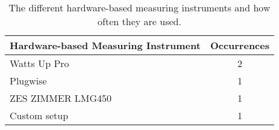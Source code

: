 \begin{table}[ht]
    \centering
    \begin{tabular}{| l | c |}
    \hline
    \textbf{Hardware-based Measuring Instrument}  & \textbf{Occurrences}                    \\ \hline
    Watts Up Pro        & 2      \\ \hline
    Plugwise            & 1      \\ \hline
    ZES ZIMMER LMG450   & 1      \\ \hline
    Custom setup        & 1      \\ \hline
    \end{tabular}
    \caption{The different hardware-based measuring instruments and how often they are used.}
    \label{tab:Hardware_based_Measuring_instruments}
    \end{table}